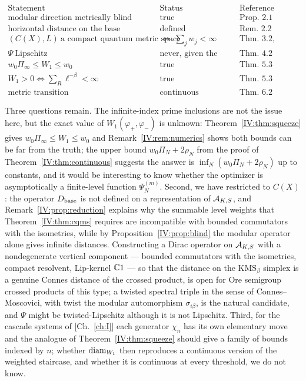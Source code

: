 \[
\begin{array}{lll}
\text{Statement} & \text{Status} & \text{Reference}\\\hline
\text{modular direction metrically blind} & \text{true} & \text{Prop.~2.1}\\
\text{horizontal distance on the base} & \text{defined} & \text{Rem.~2.2}\\
(C(X),L)\ \text{a compact quantum metric space} & \iff\ \textstyle\sum_jw_j<\infty & \text{Thm.~3.2, Rem.~3.3}\\
\Psi\ \text{Lipschitz} & \text{never, given the above} & \text{Thm.~4.2}\\
w_0\Pi_\infty\le W_1\le w_0 & \text{true} & \text{Thm.~5.3}\\
W_1>0\iff\sum_R\ell^{-\beta}<\infty & \text{true} & \text{Thm.~5.3}\\
\text{metric transition} & \text{continuous} & \text{Thm.~6.2}
\end{array}
\]

Three questions remain. The infinite-index prime inclusions are not the issue here, but the
exact value of $W_1(\varphi_+,\varphi_-)$ is unknown: Theorem~\ref{IV:thm:squeeze} gives
$w_0\Pi_\infty\le W_1\le w_0$ and Remark~\ref{IV:rem:numerics} shows both bounds can be far
from the truth; the upper bound $w_0\Pi_N+2\rho_N$ from the proof of
Theorem~\ref{IV:thm:continuous} suggests the answer is $\inf_N(w_0\Pi_N+2\rho_N)$ up to
constants, and it would be interesting to know whether the optimizer is asymptotically a
finite-level function $\Psi^{(m)}_N$. Second, we have restricted to $C(X)$: the operator $D_{\mathrm{base}}$ is not defined on a
representation of $\mathcal{A}_{K,S}$, and Remark~\ref{IV:prop:reduction} explains why the summable
level weights that Theorem~\ref{IV:thm:cqms} requires are incompatible with bounded
commutators with the isometries, while by Proposition~\ref{IV:prop:blind} the modular operator
alone gives infinite distances. Constructing a Dirac operator on $\mathcal{A}_{K,S}$ with a
nondegenerate vertical component --- bounded commutators with the isometries, compact
resolvent, Lip-kernel $\mathbb{C}1$ --- so that the distance on the $\mathrm{KMS}_\beta$ simplex is
a genuine Connes distance of the crossed product, is open for Ore semigroup crossed
products of this type; a twisted spectral triple in the sense of Connes--Moscovici, with
twist the modular automorphism $\sigma_{i\beta}$, is the natural candidate, and $\Psi$ might
be twisted-Lipschitz although it is not Lipschitz.
Third, for the cascade systems of [Ch.~\ref{ch:I}] each generator $\chi_n$ has its own
elementary move and the analogue of Theorem~\ref{IV:thm:squeeze} should give a family of bounds
indexed by $n$; whether $\operatorname{diam}_{W_1}$ then reproduces a continuous version of the weighted
staircase, and whether it is continuous at every threshold, we do not know.

